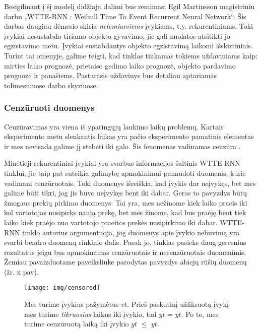 \documentclass{VUMIFPSkursinis}
\begin{document}
Besigilinant į šį modelį didžiaja dalimi bus remimasi Egil Martinsson magistriniu darbu „WTTE-RNN : Weibull Time To Event Recurrent Neural Network“. Šis darbas daugiau dėmesio skiria \textit{nelemiamiems} įvykiams, t.y. rekurentiniams. Toki įvykiai nesustabdo tiriamo objekto gyvavimo, jie gali nuolatos atsitikti jo egzistavimo metu. Įvykiai sustabdantys objekto egzistavimą laikomi išskirtiniais. Turint tai omenyje, galime teigti, kad tinklas tinkamas tokiems uždaviniams kaip: mirties laiko prognozė, prietaiso gedimo laiko prognozė, objekto pardavimo prognozė ir panašiems. Pastarasis uždavinys bus detaliau aptariamas tolimesniuose darbo skyriuose.

\subsubsection{Cenzūruoti duomenys}

Ceuzūravimas yra viena iš ypatingųjų laukimo laikų problemų. Kartais eksperimento metu slenkantis laikas yra pačio eksperimento pamatinis elementas ir mes nevisada galime jį stebėti iki galo. Šis fenomenas vadinamas cenzūra \cite{WTTEBLOG}. 



Minėtieji rekurentiniai įvykiai yra svarbus informacijos šaltinis WTTE-RNN tinklui, jie taip pat suteikia galimybę apmokinimui panaudoti duomenis, kurie vadimani cenzūruotais. Toki duomenys išreiškia, kad įvykis dar neįvykęs, bet mes galime būti tikri, jog jis buvo neįvykęs bent iki dabar. Geras to pavyzdys būtų žmogaus prekių pirkimo duomenys. Tai yra, mes nežinome kiek laiko praeis iki kol vartotojas nusipirks naują prekę, bet mes žinome, kad bus praėję bent tiek laiko kiek praėjo nuo vartotojo praeitos prekės nusipirkimo iki dabar. WTTE-RNN tinklo autorius argumentuoja, jog duomenys apie įvykio nebuvimą yra svarbi bendro duomenų rinkinio dalis. Pasak jo, tinklas pasieks daug geresnius rezultatus jeigu bus apmokinamas cenzūruotais ir necenzūruotais duomenimis. Žemiau pavaizduotame paveiksliuke parodytas pavyzdys abiejų rūšių duomenų (žr. x pav).

\begin{figure}[H]
  \centering
  \texttt{[image: img/censored]}
  \caption{ Mes turime įvykius pažymėtus $v${\scriptsize t}. Prieš paskutinį užfiksuotą įvykį mes turime \textit{tikruosius} laikus iki įvykio, tad \~{$y$}{\scriptsize $t$} = $y${\scriptsize $t$}. Po to, mes turime cenzūruotą laiką iki įvykio \~{$y$}{\scriptsize $t$} $\leq$ {$y$}{\scriptsize $t$}\cite{WTTEBLOG}.}
  \label{img:censored}
\end{figure}
\end{document}
